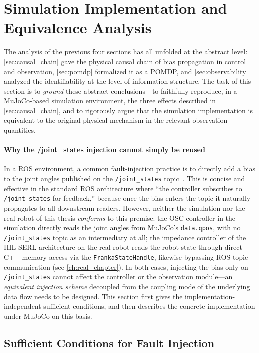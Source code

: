 \section{Simulation Implementation and Equivalence Analysis}\label{sec:sim_implementation}

The analysis of the previous four sections has all unfolded at the abstract level: \cref{sec:causal_chain} gave the physical causal chain of bias propagation in control and observation, \cref{sec:pomdp} formalized it as a POMDP, and \cref{sec:observability} analyzed the identifiability at the level of information structure. The task of this section is to \emph{ground} these abstract conclusions---to faithfully reproduce, in a MuJoCo-based simulation environment, the three effects described in \cref{sec:causal_chain}, and to rigorously argue that the simulation implementation is equivalent to the original physical mechanism in the relevant observation quantities.

\paragraph{Why the /joint\_states injection cannot simply be reused} In a ROS environment, a common fault-injection practice is to directly add a bias to the joint angles published on the \texttt{/joint\_states} topic~\cite{ma2023case}. This is concise and effective in the standard ROS architecture where ``the controller subscribes to \texttt{/joint\_states} for feedback,'' because once the bias enters the topic it naturally propagates to all downstream readers. However, neither the simulation nor the real robot of this thesis \emph{conforms} to this premise: the OSC controller in the simulation directly reads the joint angles from MuJoCo's \texttt{data.qpos}, with no \texttt{/joint\_states} topic as an intermediary at all; the impedance controller of the HIL-SERL architecture on the real robot reads the robot state through direct C++ memory access via the \texttt{FrankaStateHandle}, likewise bypassing ROS topic communication (see \cref{ch:real_chapter}). In both cases, injecting the bias only on \texttt{/joint\_states} cannot affect the controller or the observation module---an \emph{equivalent injection scheme} decoupled from the coupling mode of the underlying data flow needs to be designed. This section first gives the implementation-independent sufficient conditions, and then describes the concrete implementation under MuJoCo on this basis.

\subsection{Sufficient Conditions for Fault Injection}\label{subsec:injection_sufficient}

